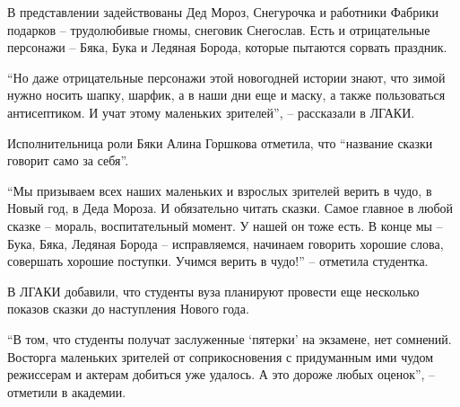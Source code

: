 В представлении задействованы Дед Мороз, Снегурочка и работники Фабрики
подарков – трудолюбивые гномы, снеговик Снегослав. Есть и отрицательные
персонажи – Бяка, Бука и Ледяная Борода, которые пытаются сорвать праздник.

\enquote{Но даже отрицательные персонажи этой новогодней истории знают, что зимой нужно
носить шапку, шарфик, а в наши дни еще и маску, а также пользоваться
антисептиком. И учат этому маленьких зрителей}, – рассказали в ЛГАКИ.

Исполнительница роли Бяки Алина Горшкова отметила, что \enquote{название сказки говорит
само за себя}.

\enquote{Мы призываем всех наших маленьких и взрослых зрителей верить в чудо, в Новый
год, в Деда Мороза. И обязательно читать сказки. Самое главное в любой сказке –
мораль, воспитательный момент. У нашей он тоже есть. В конце мы – Бука, Бяка,
Ледяная Борода – исправляемся, начинаем говорить хорошие слова, совершать
хорошие поступки. Учимся верить в чудо!} – отметила студентка.

В ЛГАКИ добавили, что студенты вуза планируют провести еще несколько показов
сказки до наступления Нового года.

\enquote{В том, что студенты получат заслуженные \enquote{пятерки} на экзамене, нет
сомнений.  Восторга маленьких зрителей от соприкосновения с придуманным ими
чудом режиссерам и актерам добиться уже удалось. А это дороже любых оценок}, –
отметили в академии.
